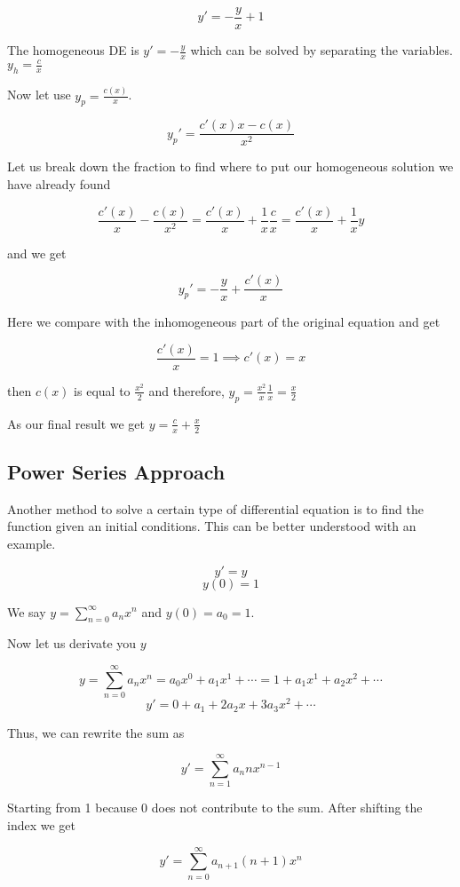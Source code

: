 \[
    y' = -\frac{y}{x} + 1
\]

The homogeneous DE is \(y' = -\frac{y}{x}\) which can be solved by separating the variables.
\(y_h = \frac{c}{x}\)

Now let use \(y_p = \frac{c(x)}{x}\).

\[
    y_{p}' = \frac{c'(x)x - c(x)}{x^2}
\]

Let us break down the fraction to find where to put our homogeneous solution we have already found

\[
    \frac{c'(x)}{x} - \frac{c(x)}{x^2} = \frac{c'(x)}{x} + \frac{1}{x}\frac{c}{x} 
    = \frac{c'(x)}{x} + \frac{1}{x}y
\]

and we get

\[
    y_{p}' = -\frac{y}{x} + \frac{c'(x)}{x} 
\]

Here we compare with the inhomogeneous part of the original equation and get

\[
    \frac{c'(x)}{x} = 1 \implies c'(x) = x
\]

then \(c(x)\) is equal to \(\frac{x^2}{2}\) and therefore, \(y_p = \frac{x^2}{x}\frac{1}{x} = 
\frac{x}{2}\)

As our final result we get \(y = \frac{c}{x} + \frac{x}{2}\)

\subsection{Power Series Approach}

Another method to solve a certain type  of differential equation
is to find the function given an initial conditions. This can be better understood with an example.

\[
    y' = y
\]
\[
    y(0) = 1
\]

We say \(y = \sum_{n = 0}^{\infty} a_n x^n\) and \(y(0) = a_0 = 1\).

Now let us derivate you \(y\)

\[
    y = \sum_{n = 0}^{\infty} a_n x^n = a_0 x^0 + a_1 x^1 + \cdots = 1 + a_1 x^1 + a_2 x^2 + \cdots
\]
\[
    y' = 0  + a_1 + 2 a_2 x + 3 a_3 x^2 + \cdots 
\]

Thus, we can rewrite the sum as 

\[
    y' = \sum_{n = 1}^{\infty} a_n n x^{n - 1}
\]

Starting from 1 because 0 does not contribute to the sum. After shifting the index we get

\[
    y' = \sum_{n = 0}^{\infty} a_{n + 1}(n + 1)x^{n}
\]

